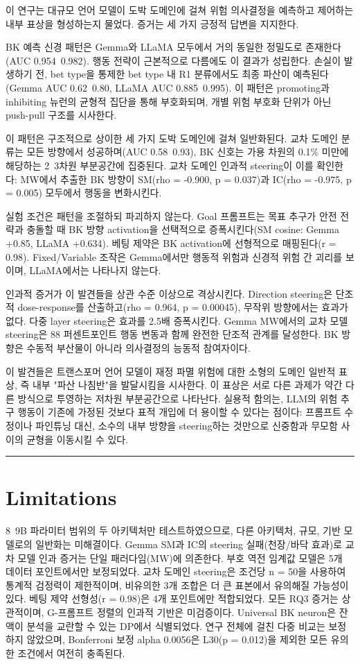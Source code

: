 \documentclass[11pt,a4paper]{article}
\begin{document}
이 연구는 대규모 언어 모델이 도박 도메인에 걸쳐 위험 의사결정을 예측하고 제어하는 내부 표상을 형성하는지 물었다. 증거는 세 가지 긍정적 답변을 지지한다.

BK 예측 신경 패턴은 Gemma와 LLaMA 모두에서 거의 동일한 정밀도로 존재한다(AUC 0.954~0.982). 행동 전략이 근본적으로 다름에도 이 결과가 성립한다. 손실이 발생하기 전, bet type을 통제한 bet type 내 R1 분류에서도 최종 파산이 예측된다(Gemma AUC 0.62~0.80, LLaMA AUC 0.885~0.995). 이 패턴은 promoting과 inhibiting 뉴런의 균형적 집단을 통해 부호화되며, 개별 위험 부호화 단위가 아닌 push-pull 구조를 시사한다.

이 패턴은 구조적으로 상이한 세 가지 도박 도메인에 걸쳐 일반화된다. 교차 도메인 분류는 모든 방향에서 성공하며(AUC 0.58~0.93), BK 신호는 가용 차원의 0.1\% 미만에 해당하는 2~3차원 부분공간에 집중된다. 교차 도메인 인과적 steering이 이를 확인한다: MW에서 추출한 BK 방향이 SM(rho = -0.900, p = 0.037)과 IC(rho = -0.975, p = 0.005) 모두에서 행동을 변화시킨다.

실험 조건은 패턴을 조절하되 파괴하지 않는다. Goal 프롬프트는 목표 추구가 안전 전략과 충돌할 때 BK 방향 activation을 선택적으로 증폭시킨다(SM cosine: Gemma +0.85, LLaMA +0.634). 베팅 제약은 BK activation에 선형적으로 매핑된다(r = 0.98). Fixed/Variable 조작은 Gemma에서만 행동적 위험과 신경적 위험 간 괴리를 보이며, LLaMA에서는 나타나지 않는다.

인과적 증거가 이 발견들을 상관 수준 이상으로 격상시킨다. Direction steering은 단조적 dose-response를 산출하고(rho = 0.964, p = 0.00045), 무작위 방향에서는 효과가 없다. 다중 layer steering은 효과를 2.5배 증폭시킨다. Gemma MW에서의 교차 모델 steering은 88 퍼센트포인트 행동 변동과 함께 완전한 단조적 관계를 달성한다. BK 방향은 수동적 부산물이 아니라 의사결정의 능동적 참여자이다.

이 발견들은 트랜스포머 언어 모델이 재정 파멸 위험에 대한 소형의 도메인 일반적 표상, 즉 내부 "파산 나침반"을 발달시킴을 시사한다. 이 표상은 서로 다른 과제가 약간 다른 방식으로 투영하는 저차원 부분공간으로 나타난다. 실용적 함의는, LLM의 위험 추구 행동이 기존에 가정된 것보다 표적 개입에 더 용이할 수 있다는 점이다: 프롬프트 수정이나 파인튜닝 대신, 소수의 내부 방향을 steering하는 것만으로 신중함과 무모함 사이의 균형을 이동시킬 수 있다.

\bigskip\hrule\bigskip

\section{Limitations}

8~9B 파라미터 범위의 두 아키텍처만 테스트하였으므로, 다른 아키텍처, 규모, 기반 모델로의 일반화는 미해결이다. Gemma SM과 IC의 steering 실패(천장/바닥 효과)로 교차 모델 인과 증거는 단일 패러다임(MW)에 의존한다. 부호 역전 임계값 모델은 5개 데이터 포인트에서만 보정되었다. 교차 도메인 steering은 조건당 n = 50을 사용하여 통계적 검정력이 제한적이며, 비유의한 3개 조합은 더 큰 표본에서 유의해질 가능성이 있다. 베팅 제약 선형성(r = 0.98)은 4개 포인트에만 적합되었다. 모든 RQ3 증거는 상관적이며, G-프롬프트 정렬의 인과적 기반은 미검증이다. Universal BK neuron은 잔액이 분석을 교란할 수 있는 DP에서 식별되었다. 연구 전체에 걸친 다중 비교는 보정하지 않았으며, Bonferroni 보정 alpha 0.0056은 L30(p = 0.012)을 제외한 모든 유의한 조건에서 여전히 충족된다.
\end{document}
